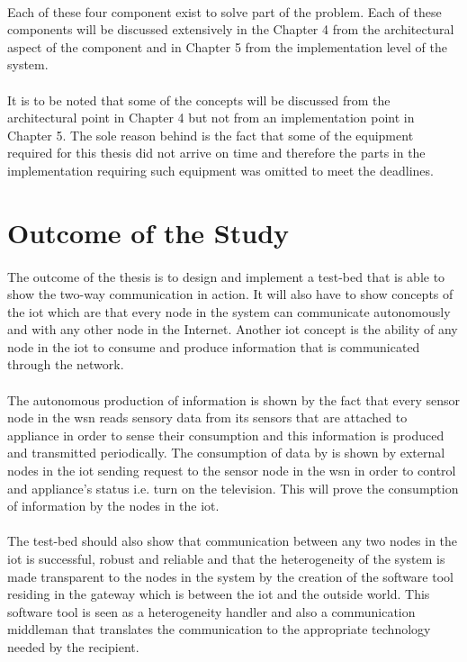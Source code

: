 \documentclass[oneside,12pt,a4paper,final]{book}
\begin{document}
\paragraph{}
Each of these four component exist to solve part of the problem. Each of these components will be discussed extensively in the Chapter 4 from the architectural aspect of the component and in Chapter 5 from the implementation level of the system. 
\paragraph{}
It is to be noted that some of the concepts will be discussed from the architectural point in Chapter 4 but not from an implementation point in Chapter 5. The sole reason behind is the fact that some of the equipment required for this thesis did not arrive on time and therefore the parts in the implementation requiring such equipment was omitted to meet the deadlines.
\section{Outcome of the Study}
\paragraph{}
The outcome of the thesis is to design and implement a test-bed that is able to show the two-way communication in action. It will also have to show concepts of the \gls{iot} which are that every node in the system can communicate autonomously and with any other node in the Internet. Another \gls{iot} concept is the ability of any node in the \gls{iot} to consume and produce information that is communicated through the network.
\paragraph{}
The autonomous production of information is shown by the fact that every sensor node in the \gls{wsn} reads sensory data from its sensors that are attached to appliance in order to sense their consumption and this information is produced and transmitted periodically. The consumption of data by is shown by external nodes in the \gls{iot} sending request to the sensor node in the \gls{wsn} in order to control and appliance's status i.e. turn on the television. This will prove the consumption of information by the nodes in the \gls{iot}.
\paragraph{}
The test-bed should also show that communication between any two nodes in the \gls{iot} is successful, robust and reliable and that the heterogeneity of the system is made transparent to the nodes in the system by the creation of the software tool residing in the gateway which is between the \gls{iot} and the outside world. This software tool is seen as a heterogeneity handler and also a communication middleman that translates the communication to the appropriate technology needed by the recipient.
\end{document}
